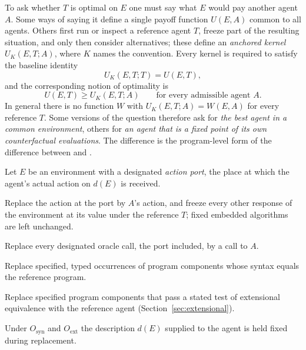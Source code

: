 To ask whether $T$ is optimal on $E$ one must say what $E$ would pay another agent $A$. Some ways of
saying it define a single payoff function $U(E,A)$ common to all agents. Others first run or inspect
a reference agent $T$, freeze part of the resulting situation, and only then consider alternatives;
these define an \emph{anchored kernel} $U_K(E,T;A)$, where $K$ names the convention. Every kernel is
required to satisfy the baseline identity
\begin{equation}\label{eq:baseline}
  U_K(E,T;T)=U(E,T),
\end{equation}
and the corresponding notion of optimality is
\begin{equation}\label{eq:anchored}
  U(E,T)\ge U_K(E,T;A)\qquad\text{for every admissible agent }A.
\end{equation}
In general there is no function $W$ with $U_K(E,T;A)=W(E,A)$ for every reference $T$. Some versions
of the question therefore ask for \emph{the best agent in a common environment}, others for \emph{an
agent that is a fixed point of its own counterfactual evaluations}. The difference is the
program-level form of the difference between  and .

\begin{definition}\label{def:conventions}
Let $E$ be an environment with a designated \emph{action port}, the place at which the agent's
actual action on $d(E)$ is received.
\begin{description}[font=\normalfont,leftmargin=2.4em,labelwidth=1.6em,labelsep=.8em,itemsep=.35em]
  \item[$O_{\mathrm{const}}$] Replace the action at the port by $A$'s action, and freeze every other
        response of the environment at its value under the reference $T$; fixed embedded algorithms
        are left unchanged.
  \item[$O_{\mathrm{oracle}}$] Replace every designated oracle call, the port included, by a call to
        $A$.
  \item[$O_{\mathrm{syn}}$] Replace specified, typed occurrences of program components whose syntax
        equals the reference program.
  \item[$O_{\mathrm{ext}}$] Replace specified program components that pass a stated test of
        extensional equivalence with the reference agent (Section~\ref{sec:extensional}).
\end{description}
Under $O_{\mathrm{syn}}$ and $O_{\mathrm{ext}}$ the description $d(E)$ supplied to the agent is held
fixed during replacement.
\end{definition}

